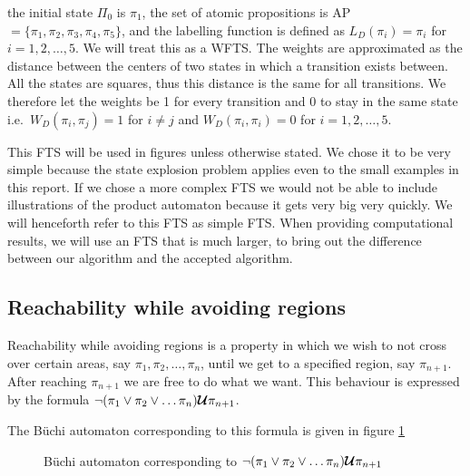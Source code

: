 the initial state $\Pi_0$ is $\pi_1$, the set of atomic propositions is AP$=\{\pi_1,\pi_2,\pi_3,\pi_4,\pi_5\}$, and the labelling function is defined as $L_D(\pi_i) = \pi_i$ for $i=1,2,\dots,5$. We will treat this as a WFTS. The weights are approximated as the distance between the centers of two states in which a transition exists between. All the states are squares, thus this distance is the same for all transitions. We therefore let the weights be 1 for every transition and 0 to stay in the same state i.e.\ $W_D(\pi_i, \pi_j) = 1$ for $i \neq j$ and $W_D(\pi_i,\pi_i)=0$ for $i=1,2,\dots,5$.

This FTS will be used in figures unless otherwise stated. We chose it to be very simple because the state explosion problem applies even to the small examples in this report. If we chose a more complex FTS we would not be able to include illustrations of the product automaton because it gets very big very quickly. We will henceforth refer to this FTS as simple FTS. When providing computational results, we will use an FTS that is much larger, to bring out the difference between our algorithm and the accepted algorithm.


\subsection{Reachability while avoiding regions} 
Reachability while avoiding regions is a property in which we wish to not cross over certain areas, say $\pi_1, \pi_2, \dots, \pi_n$, until we get to a specified region, say $\pi_{n+1}$. After reaching $\pi_{n+1}$ we are free to do what we want. This behaviour is expressed by the formula $\neg (\pi_1 \lor \pi_2 \lor \dots \pi_n) \bm{\mathcal{U}} \pi_{n+1}$. 

The B\"{u}chi automaton corresponding to this formula is given in figure \ref{fig:ReachAvoid}

\begin{figure}
\centering
{}
\caption{B\"{u}chi automaton corresponding to $\neg (\pi_1 \lor \pi_2 \lor \dots \pi_n) \bm{\mathcal{U}} \pi_{n+1}$}
\label{fig:ReachAvoid}
\end{figure}

